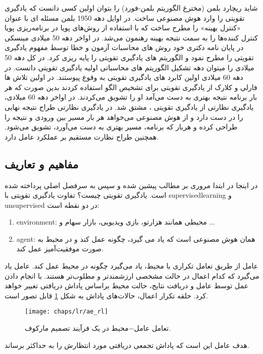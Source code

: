  شاید ریچارد بلمن (مخترع الگوریتم بلمن-فورد) را بتوان اولین کسی دانست که یادگیری تقویتی را وارد هوش مصنوعی ساخت. در اوایل دهه 1950 بلمن مسئله ای با عنوان «کنترل بهینه» را مطرح ساخت که با استفاده از روش‌های پویا در برنامه‌ریزی پویا کنترل کننده‌ها را به سمت نتیجه بهینه رهنمون می‌شد. در اواخر دهه 50 میلادی مینسکی در پایان نامه دکتری خود روش های محاسبات آزمون و خطا توسط مفهوم یادگیری تقویتی را مطرح نمود و الگوریتم های یادگیری تقویتی را پایه ریزی کرد. در کل دهه 50 میلادی را میتوان دهه تشکیل الگوریتم های محاسباتی اولیه یادگیری تقویتی دانست. در دهه 60 میلادی اولین کابرد های یادگیری تقویتی به وقوع پیوستند. در اولین تلاش ها فارلی و کلارک از یادگیری تقویتی برای تشخیص الگو استفاده کردند بدین صورت که هر بار برنامه نتیجه بهتری به دست می‌آمد او را تشویق می‌کردند. در اواخر دهه 60 میلادی، یادگیری نظارتی از یادگیری تقویتی ، مشتق شد. در یادگیری نظارتی طراح نتیجه نهایی را در دست دارد و از هوش مصنوعی می‌خواهد هر بار مسیر بین ورودی و نتیجه را طراحی کرده و هربار که برنامه، مسیر بهتری به دست می‌آورد، تشویق می‌شود. همچنین طراح نظارت مستقیم بر عملکرد عامل دارد.

 \subsection{مفاهیم و تعاریف}
 در اینجا در ابتدا مروری بر مطالب پیشین شده و سپس به سرفصل اصلی پرداخته شده است.
 یادگیری تقویتی چیست؟
 تفاوت یادگیری تقویتی با \gls{supervisedlearning} و \gls{unsupervised} در دو نقطه است:
 \begin{enumerate}
 	\item \gls{environment}: محیطی همانند هزارتو، بازی ویدیویی، بازار سهام و ...
 	\item \gls{agent}: همان هوش مصنوعی است که یاد می گیرد، چگونه عمل کند و در محیط به صورت موفقیت‌آمیز عمل کند.
 \end{enumerate}
 عامل از طریق تعامل تکراری با محیط، یاد می‌گیرد چگونه در محیط عمل کند. عامل یاد می‌گیرد که کدام اعمال در حالت مشخصی ارزشمندتر و مطلوب‌تر هستند. با انجام دادن عمل توسط عامل و دریافت نتایج، حالت محیط براساس پاداش دریافتی تغییر خواهد کرد. حلقه تکرار اعمال، حالات‌های پاداش به شکل 	\ref{fig:ch_lr:ae_rl} قابل تصور است.
 
 \begin{figure}[!ht]
 	\centerline{\texttt{[image: chaps/lr/ae\_rl]}}
 	\caption{تعامل عامل$-$محیط در یک فرآیند تصمیم مارکوف.}
 	\label{fig:ch_lr:ae_rl}
 \end{figure}
\noindent
 هدف عامل این است که پاداش تجمعی دریافتی مورد انتظارش را به حداکثر برساند.
